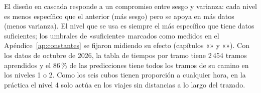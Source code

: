 El diseño en cascada responde a un compromiso entre sesgo y varianza: cada nivel es menos específico que el anterior
(más sesgo) pero se apoya en más datos (menos varianza). El nivel que se usa es siempre el más específico que tiene
datos suficientes; los umbrales de «suficiente» marcados como medidos en el Apéndice~\ref{ap:constantes} se fijaron
midiendo su efecto (capítulos
«» y «»). Con los datos de octubre de 2026, la tabla de tiempos por
tramo tiene 2\,454 tramos aprendidos y el 86\,\% de las predicciones tiene todos los tramos de su camino en los niveles
1 o 2. Como los seis cubos tienen proporción a cualquier hora, en la práctica el nivel 4 solo actúa en los viajes sin
distancias a lo largo del trazado.
